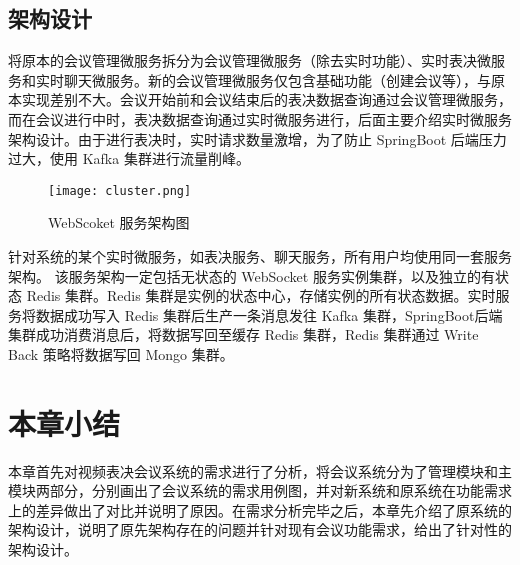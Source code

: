 \subsection{架构设计}
将原本的会议管理微服务拆分为会议管理微服务（除去实时功能）、实时表决微服务和实时聊天微服务。新的会议管理微服务仅包含基础功能（创建会议等），与原本实现差别不大。会议开始前和会议结束后的表决数据查询通过会议管理微服务，而在会议进行中时，表决数据查询通过实时微服务进行，后面主要介绍实时微服务架构设计。由于进行表决时，实时请求数量激增，为了防止 SpringBoot 后端压力过大，使用 Kafka 集群进行流量削峰。

\begin{figure}[!htp]
  \centering
  \texttt{[image: cluster.png]}
  \caption[实时微服务架构]
    {WebScoket 服务架构图}
 \label{fig:cluster}
\end{figure}

针对系统的某个实时微服务，如表决服务、聊天服务，所有用户均使用同一套服务架构。
该服务架构一定包括无状态的 WebSocket 服务实例集群，以及独立的有状态 Redis 集群。Redis 集群是实例的状态中心，存储实例的所有状态数据。实时服务将数据成功写入 Redis 集群后生产一条消息发往 Kafka 集群，SpringBoot后端集群成功消费消息后，将数据写回至缓存 Redis 集群，Redis 集群通过 Write Back 策略将数据写回 Mongo 集群。


\section{本章小结}
本章首先对视频表决会议系统的需求进行了分析，将会议系统分为了管理模块和主模块两部分，分别画出了会议系统的需求用例图，并对新系统和原系统在功能需求上的差异做出了对比并说明了原因。在需求分析完毕之后，本章先介绍了原系统的架构设计，说明了原先架构存在的问题并针对现有会议功能需求，给出了针对性的架构设计。